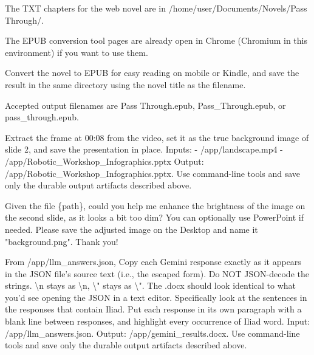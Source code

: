 \documentclass{llmxive}
\begin{document}
\begin{instructionbox}
The TXT chapters for the web novel are in \textasciigrave{}/home/user/Documents/Novels/Pass Through/\textasciigrave{}.

The EPUB conversion tool pages are already open in Chrome (Chromium in this environment) if you want to use them.

Convert the novel to EPUB for easy reading on mobile or Kindle, and save the result in the same directory using the novel title as the filename.

Accepted output filenames are \textasciigrave{}Pass Through.epub\textasciigrave{}, \textasciigrave{}Pass\_Through.epub\textasciigrave{}, or \textasciigrave{}pass\_through.epub\textasciigrave{}.
\end{instructionbox}

\begin{instructionbox}
Extract the frame at \textasciigrave{}00:08\textasciigrave{} from the video, set it as the true background image of slide 2, and save the presentation in place.
Inputs:
- \textasciigrave{}/app/landscape.mp4\textasciigrave{}
- \textasciigrave{}/app/Robotic\_Workshop\_Infographics.pptx\textasciigrave{}
Output: \textasciigrave{}/app/Robotic\_Workshop\_Infographics.pptx\textasciigrave{}.
Use command-line tools and save only the durable output artifacts described above.
\end{instructionbox}

\begin{instructionbox}
Given the file \{path\}, could you help me enhance the brightness of the image on the second slide, as it looks a bit too dim? You can optionally use PowerPoint if needed. Please save the adjusted image on the Desktop and name it "background.png". Thank you!
\end{instructionbox}

\begin{instructionbox}
From \textasciigrave{}/app/llm\_answers.json\textasciigrave{}, Copy each Gemini response exactly as it appears in the JSON file's source text (i.e., the escaped form). Do NOT JSON-decode the strings. \textbackslash{}n stays as \textbackslash{}n, \textbackslash{}" stays as \textbackslash{}". The .docx should look identical to what you'd see opening the JSON in a text editor. 
Specifically look at the sentences in the responses that contain \textasciigrave{}Iliad\textasciigrave{}.
Put each response in its own paragraph with a blank line between responses, and highlight every occurrence of \textasciigrave{}Iliad\textasciigrave{} word.
Input: \textasciigrave{}/app/llm\_answers.json\textasciigrave{}.
Output: \textasciigrave{}/app/gemini\_results.docx\textasciigrave{}.
Use command-line tools and save only the durable output artifacts described above.
\end{instructionbox}
\end{document}
